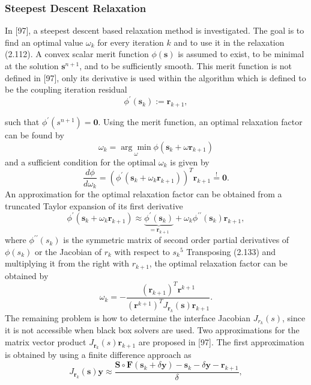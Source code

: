 \subsubsection{Steepest Descent Relaxation}

In [97], a steepest descent based relaxation method is investigated. The goal is to find an optimal value \(\omega_{k}\) for every iteration \(k\) and to use it in the relaxation (2.112). A convex scalar merit function \(\phi(\boldsymbol{s})\) is assumed to exist, to be minimal at the solution \(\boldsymbol{s}^{n+1}\), and to be sufficiently smooth. This merit function is not defined in [97], only its derivative is used within the algorithm which is defined to be the coupling iteration residual
\[
\phi^{\prime}\left(\boldsymbol{s}_{k}\right):=\boldsymbol{r}_{k+1},
\]

such that \(\phi^{\prime}\left(s^{n+1}\right)=\mathbf{0}\). Using the merit function, an optimal relaxation factor can be found by
\[
\omega_{k}=\underset{\omega}{\arg \min } \phi\left(\boldsymbol{s}_{k}+\omega \boldsymbol{r}_{k+1}\right)
\]
and a sufficient condition for the optimal \(\omega_{k}\) is given by
\[
\frac{d \phi}{d \omega_{k}}=\left(\phi^{\prime}\left(\boldsymbol{s}_{k}+\omega_{k} \boldsymbol{r}_{k+1}\right)\right)^{T} \boldsymbol{r}_{k+1} \stackrel{!}{=} \mathbf{0} .
\]
An approximation for the optimal relaxation factor can be obtained from a truncated Taylor expansion of its first derivative
\[
\phi^{\prime}\left(\boldsymbol{s}_{k}+\omega_{k} \boldsymbol{r}_{k+1}\right) \approx \underbrace{\phi^{\prime}\left(\boldsymbol{s}_{k}\right)}_{=\boldsymbol{r}_{k+1}}+\omega_{k} \phi^{\prime \prime}\left(\boldsymbol{s}_{k}\right) \boldsymbol{r}_{k+1},
\]
where \(\phi^{\prime \prime}\left(s_{k}\right)\) is the symmetric matrix of second order partial derivatives of \(\phi\left(s_{k}\right)\) or the Jacobian of \(r_{k}\) with respect to \(s_{k}{ }^{5}\) Transposing (2.133) and multiplying it from the right with \(r_{k+1}\), the optimal relaxation factor can be obtained by
\[
\omega_{k}=-\frac{\left(\boldsymbol{r}_{k+1}\right)^{T} \boldsymbol{r}^{k+1}}{\left(\boldsymbol{r}^{k+1}\right)^{T} J_{\boldsymbol{r}_{k}}(\boldsymbol{s}) \boldsymbol{r}_{k+1}} .
\]
The remaining problem is how to determine the interface Jacobian \(J_{r_{k}}(s)\), since it is not accessible when black box solvers are used. Two approximations for the matrix vector product \(J_{\boldsymbol{r}_{k}}(s) \boldsymbol{r}_{k+1}\) are proposed in [97]. The first approximation is obtained by using a finite difference approach as
\[
J_{\boldsymbol{r}_{k}}(\boldsymbol{s}) \boldsymbol{y} \approx \frac{\boldsymbol{S} \circ \boldsymbol{F}\left(\boldsymbol{s}_{k}+\delta \boldsymbol{y}\right)-\boldsymbol{s}_{k}-\delta \boldsymbol{y}-\boldsymbol{r}_{k+1}}{\delta},
\]

